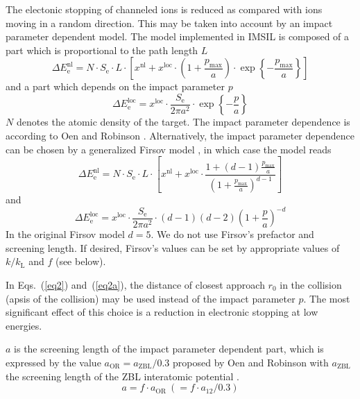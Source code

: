 The electonic stopping of channeled ions is reduced as compared with ions 
moving in a random direction. This may be taken into account by an impact 
parameter dependent model. The model implemented in IMSIL is composed of a part
which is proportional to the path length $L$
%
\begin{equation}
   \Delta E_\mathrm{e}^\mathrm{nl} = 
      N \cdot S_\mathrm{e} \cdot L \cdot
      \left[ x^\mathrm{nl} + x^\mathrm{loc} \cdot 
      \left( 1 + \frac{p_\mathrm{max}}{a} \right)
             \cdot \exp \left\{ - \frac{p_\mathrm{max}}{a} \right\} \right]
   \label{eq1}
\end{equation}
%
and a part which depends on the impact parameter $p$ 
%
\begin{equation}
   \Delta E_\mathrm{e}^\mathrm{loc} = 
      x^\mathrm{loc} \cdot \frac{S_\mathrm{e}}{2 \pi a^2} \cdot
      \exp \left\{ - \frac{p}{a} \right\}
   \label{eq2}
\end{equation}
%
$N$ denotes the atomic density of the target. The impact parameter dependence
is according to Oen and Robinson \cite{I7607}. Alternatively, the impact 
parameter dependence can be chosen by a generalized Firsov model \cite{I5901}, 
in which case the model reads
%
\begin{equation}
   \Delta E_\mathrm{e}^\mathrm{nl} = 
      N \cdot S_\mathrm{e} \cdot L \cdot
      \left[ x^\mathrm{nl} + x^\mathrm{loc} \cdot \frac{
      1 + (d-1) \frac{p_\mathrm{max}}{a}}{
      \left( 1 + \frac{p_\mathrm{max}}{a} \right) ^ {d-1}} \right]
   \label{eq1a}
\end{equation}
%
and
%
\begin{equation}
   \Delta E_\mathrm{e}^\mathrm{loc} = 
      x^\mathrm{loc} \cdot \frac{S_\mathrm{e}}{2 \pi a^2} \cdot
      (d-1) (d-2) \left( 1 + \frac{p}{a} \right) ^ {-d}
   \label{eq2a}
\end{equation}
%
In the original Firsov model $d=5$. We do not use Firsov's prefactor and
screening length. If desired, Firsov's values can be set by appropriate values
of $k/k_\mathrm{L}$ and $f$ (see below).

In Eqs.~(\ref{eq2}) and~(\ref{eq2a}), the distance of closest approach $r_0$ 
in the collision (apsis of the collision) may be used instead of the impact
parameter $p$. The most significant effect of this choice is a reduction in
electronic stopping at low energies.

$a$ is the screening length of the impact parameter dependent part, which 
is expressed by the value $a_\mathrm{OR}=a_\mathrm{ZBL}/0.3$ proposed by Oen and
Robinson \cite{I7607} with $a_\mathrm{ZBL}$ the screening length of the ZBL
interatomic potential \cite{I8512}.
%
\begin{equation}
   a = f \cdot a_\mathrm{OR} ~( = f \cdot a_{12} / 0.3 )
   \label{eq5}
\end{equation}
%

